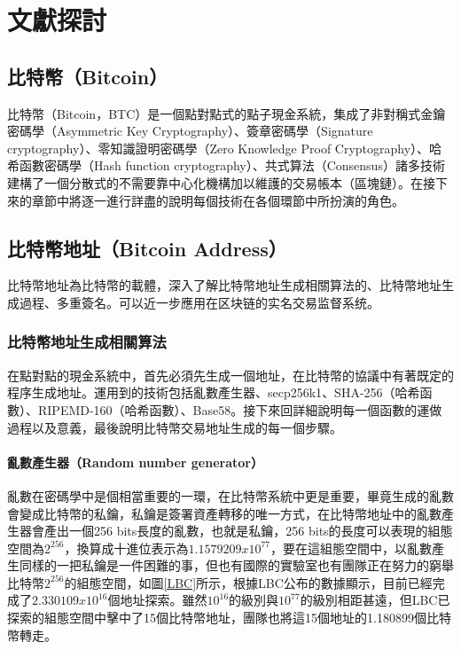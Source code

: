 
\chapter{文獻探討}

	\section{比特幣（Bitcoin）}
	比特幣（Bitcoin，BTC）是一個點對點式的點子現金系統，集成了非對稱式金鑰密碼學（Asymmetric Key Cryptography）\supercite{AsymmetricKeyCryptography}、簽章密碼學（Signature cryptography）、零知識證明密碼學（Zero Knowledge Proof Cryptography）\supercite{Zero-KnowledgeProofsofIdentity}、哈希函數密碼學（Hash function cryptography）、共式算法（Consensus）諸多技術建構了一個分散式的不需要靠中心化機構加以維護的交易帳本（區塊鏈）。在接下來的章節中將逐一進行詳盡的說明每個技術在各個環節中所扮演的角色。

	\section{比特幣地址（Bitcoin Address）}
	比特幣地址為比特幣的載體，深入了解比特幣地址生成相關算法的、比特幣地址生成過程、多重簽名。可以近一步應用在区块链的实名交易监督系统。

		\subsection{比特幣地址生成相關算法}
		在點對點的現金系統中，首先必須先生成一個地址，在比特幣的協議中有著既定的程序生成地址。運用到的技術包括亂數產生器、secp256k1\supercite{johnson2001elliptic}、SHA-256（哈希函數）\supercite{DBLP:conf/fse/KhovratovichRS12}、RIPEMD-160（哈希函數）\supercite{DBLP:conf/isw/MendelPRR06}、Base58\supercite{Base58}。接下來回詳細說明每一個函數的運做過程以及意義，最後說明比特幣交易地址生成的每一個步驟。
		
			\subsubsection{亂數產生器（Random number generator）}
			亂數在密碼學中是個相當重要的一環，在比特幣系統中更是重要，畢竟生成的亂數會變成比特幣的私鑰，私鑰是簽署資產轉移的唯一方式，在比特幣地址中的亂數產生器會產出一個256 bits長度的亂數，也就是私鑰，256 bits的長度可以表現的組態空間為$2^{256}$，換算成十進位表示為$1.1579209x10^{77}$，要在這組態空間中，以亂數產生同樣的一把私鑰是一件困難的事，但也有國際的實驗室\supercite{TheLargeBitcoinCollider}也有團隊正在努力的窮舉比特幣$2^{256}$的組態空間，如圖\ref{LBC}所示，根據LBC公布的數據顯示，目前已經完成了$2.330109x10^{16}$個地址探索。雖然$10^{16}$的級別與$10^{77}$的級別相距甚遠，但LBC已探索的組態空間中擊中了15個比特幣地址，團隊也將這15個地址的1.180899個比特幣轉走。

